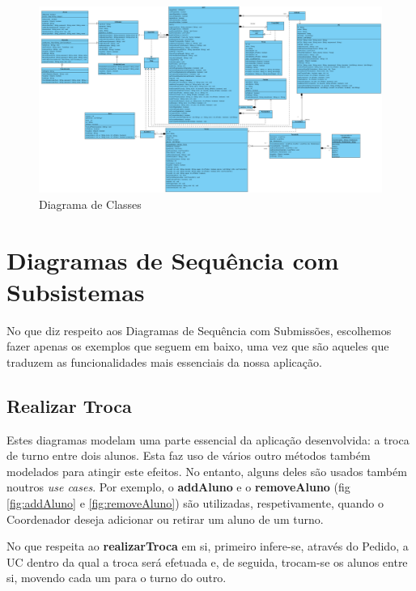 \documentclass[12pt,a4paper]{report}
\begin{document}
\begin{landscape}
\begin{figure}[H]
	\centering 
	\includegraphics[width=1.6\textwidth]{modelacao/diagramas_de_classe/diagrama_classes.png}  
	\caption{Diagrama de Classes}
\end{figure}
\vfill
\thispagestyle{empty}
\raisebox{}{\makebox[\linewidth]{\thepage}}
\end{landscape} 
 
\chapter{Diagramas de Sequência com Subsistemas}
No que diz respeito aos Diagramas de Sequência com Submissões, escolhemos fazer apenas os exemplos que seguem em baixo, uma vez que são aqueles que traduzem as funcionalidades mais essenciais da nossa aplicação.

\section{Realizar Troca}
Estes diagramas modelam uma parte essencial da aplicação desenvolvida: a troca de turno entre dois alunos. Esta faz uso de vários outro métodos também modelados para atingir este efeitos. No entanto, alguns deles são usados também noutros \textit{use cases}. Por exemplo, o \textbf{addAluno} e o \textbf{removeAluno} (fig \ref{fig:addAluno} e \ref{fig:removeAluno}) são utilizadas, respetivamente, quando o Coordenador deseja adicionar ou retirar um aluno de um turno.

No que respeita ao \textbf{realizarTroca} em si, primeiro infere-se, através do Pedido, a UC dentro da qual a troca será efetuada e, de seguida, trocam-se os alunos entre si, movendo cada um para o turno do outro.
\end{document}
